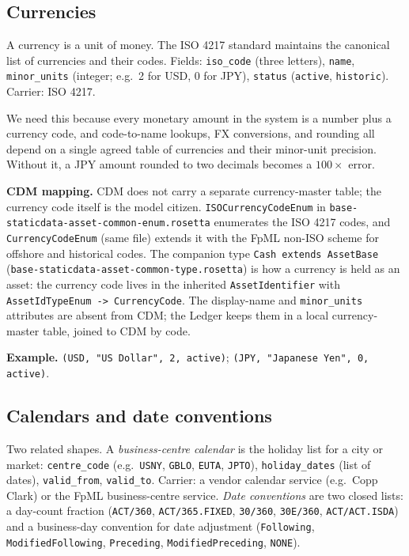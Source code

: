 \documentclass[11pt,a4paper]{article}
\begin{document}
\subsection{Currencies}

A currency is a unit of money. The ISO 4217 standard maintains the canonical list of currencies and their codes. Fields: \texttt{iso\_code} (three letters), \texttt{name}, \texttt{minor\_units} (integer; e.g.\ 2 for USD, 0 for JPY), \texttt{status} (\texttt{active}, \texttt{historic}). Carrier: ISO 4217.

We need this because every monetary amount in the system is a number plus a currency code, and code-to-name lookups, FX conversions, and rounding all depend on a single agreed table of currencies and their minor-unit precision. Without it, a JPY amount rounded to two decimals becomes a $100\times$ error.

\textbf{CDM mapping.} CDM does not carry a separate currency-master table; the currency code itself is the model citizen. \texttt{ISOCurrencyCodeEnum} in \texttt{base-staticdata-asset-common-enum.rosetta} enumerates the ISO 4217 codes, and \texttt{CurrencyCodeEnum} (same file) extends it with the FpML non-ISO scheme for offshore and historical codes. The companion type \texttt{Cash extends AssetBase} (\texttt{base-staticdata-asset-common-type.rosetta}) is how a currency is held as an asset: the currency code lives in the inherited \texttt{AssetIdentifier} with \texttt{AssetIdTypeEnum -> CurrencyCode}. The display-name and \texttt{minor\_units} attributes are absent from CDM; the Ledger keeps them in a local currency-master table, joined to CDM by code.

\textbf{Example.} \texttt{(USD, "US Dollar", 2, active)}; \texttt{(JPY, "Japanese Yen", 0, active)}.

\subsection{Calendars and date conventions}

Two related shapes. A \emph{business-centre calendar} is the holiday list for a city or market: \texttt{centre\_code} (e.g.\ \texttt{USNY}, \texttt{GBLO}, \texttt{EUTA}, \texttt{JPTO}), \texttt{holiday\_dates} (list of dates), \texttt{valid\_from}, \texttt{valid\_to}. Carrier: a vendor calendar service (e.g.\ Copp Clark) or the FpML business-centre service. \emph{Date conventions} are two closed lists: a day-count fraction (\texttt{ACT/360}, \texttt{ACT/365.FIXED}, \texttt{30/360}, \texttt{30E/360}, \texttt{ACT/ACT.ISDA}) and a business-day convention for date adjustment (\texttt{Following}, \texttt{ModifiedFollowing}, \texttt{Preceding}, \texttt{ModifiedPreceding}, \texttt{NONE}).
\end{document}
